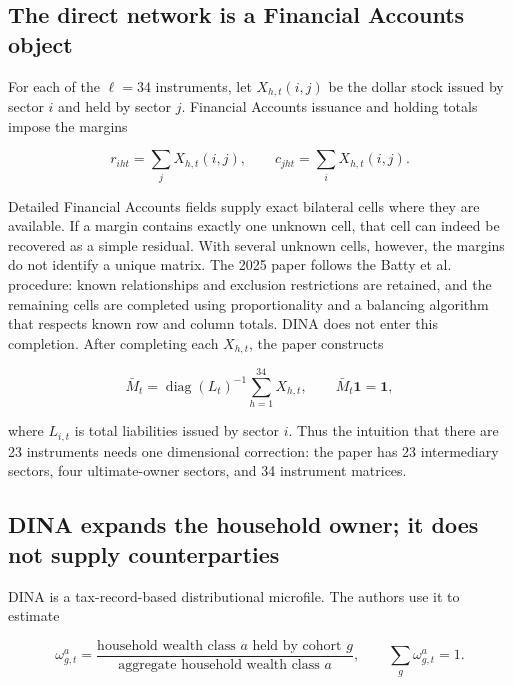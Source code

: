 \documentclass[11pt]{article}
\newcommand{\matM}{\bar M}
\begin{document}
\subsection{The direct network is a Financial Accounts object}

For each of the \(\ell=34\) instruments, let \(X_{h,t}(i,j)\) be the dollar
stock issued by sector \(i\) and held by sector \(j\).  Financial Accounts
issuance and holding totals impose the margins

\begin{equation}
  r_{iht}=\sum_jX_{h,t}(i,j),
  \qquad
  c_{jht}=\sum_iX_{h,t}(i,j).
  \label{eq:fwtw-margins}
\end{equation}

Detailed Financial Accounts fields supply exact bilateral cells where they
are available.  If a margin contains exactly one unknown cell, that cell can
indeed be recovered as a simple residual.  With several unknown cells, however,
the margins do not identify a unique matrix.  The 2025 paper follows the Batty
et al. procedure: known relationships and exclusion restrictions are retained,
and the remaining cells are completed using proportionality and a balancing
algorithm that respects known row and column totals.  DINA does not enter this
completion.  After completing each \(X_{h,t}\), the paper constructs

\begin{equation}
  \matM_t
  =\operatorname{diag}(L_t)^{-1}\sum_{h=1}^{34}X_{h,t},
  \qquad \matM_t\mathbf 1=\mathbf 1,
  \label{eq:fwtw-to-direct}
\end{equation}

where \(L_{i,t}\) is total liabilities issued by sector \(i\).  Thus the
intuition that there are 23 instruments needs one dimensional correction:
the paper has 23 intermediary sectors, four ultimate-owner sectors, and 34
instrument matrices.

\subsection{DINA expands the household owner; it does not supply counterparties}

DINA is a tax-record-based distributional microfile.  The authors use it to
estimate

\begin{equation}
  \omega^a_{g,t}
  =\frac{\text{household wealth class \(a\) held by cohort \(g\)}}
         {\text{aggregate household wealth class \(a\)}},
  \qquad \sum_g\omega^a_{g,t}=1.
  \label{eq:dina-share}
\end{equation}
\end{document}
